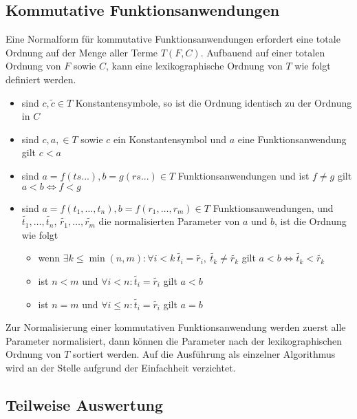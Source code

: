 \documentclass{scrartcl}
\numberwithin{figure}{section} %
\theoremstyle{definition} %
\begin{document}
\subsection{Kommutative Funktionsanwendungen} \label{subsecNormalSortieren}
Eine Normalform für kommutative Funktionsanwendungen erfordert eine totale Ordnung auf der Menge aller Terme $T(F, C)$. Aufbauend auf einer totalen Ordnung von $F$ sowie $C$, kann eine lexikographische Ordnung von $T$ wie folgt definiert werden. 
\begin{itemize}
	\item{sind $c, \tilde{c} \in T$ Konstantensymbole, so ist die Ordnung identisch zu der Ordnung in $C$}
	\item{sind $c, a, \in T$ sowie $c$ ein Konstantensymbol und $a$ eine Funktionsanwendung gilt $c < a$ }
	\item{sind $a = f(ts...), b = g(rs...) \in T$ Funktionsanwendungen und ist $f \neq g$ gilt $a < b \iff f < g $}
	\item{sind $a = f(t_1, \dots, t_n), b = f(r_1, \dots, r_m) \in T$ Funktionsanwendungen, und $\tilde{t_1}, \dots, \tilde{t_n}$, $\tilde{r_1}, \dots, \tilde{r_m}$ die normalisierten Parameter von $a$ und $b$, ist die Ordnung wie folgt}
	\begin{itemize}
		\item{wenn $\exists k \leq \min{(n, m)} \colon \forall i < k ~ \tilde{t_i} = \tilde{r_i} ,~ \tilde{t_k} \neq \tilde{r_k} $ gilt ${a < b \iff \tilde{t_k} < \tilde{r_k}}$}
		\item{ist $n < m$ und $\forall i < n\colon \tilde{t_i} = \tilde{r_i}$ gilt $a < b$}
		\item{ist $n = m$ und $\forall i \leq n\colon \tilde{t_i} = \tilde{r_i}$ gilt $a = b$}
	\end{itemize}
\end{itemize}
Zur Normalisierung einer kommutativen Funktionsanwendung werden zuerst alle Parameter normalisiert, dann können die Parameter nach der lexikographischen Ordnung von $T$ sortiert werden. Auf die Ausführung als einzelner Algorithmus wird an der Stelle aufgrund der Einfachheit verzichtet.

\subsection{Teilweise Auswertung} \label{subsecNormalKombinieren}

\begin{algorithm}
\DontPrintSemicolon
\caption{$\mathrm{combine} \colon T \rightarrow T$}\label{combine}
\end{algorithm}
\end{document}

